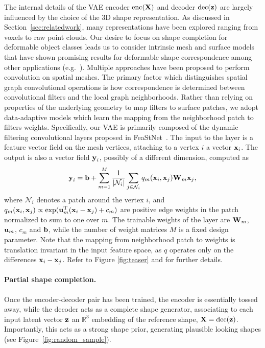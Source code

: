 The internal details of the VAE encoder $\mathrm{enc}(\bm{\mathrm{X}})$ and decoder $\mathrm{dec}(\bm{\mathrm{z}})$ are largely influenced by the choice of the 3D shape representation. As discussed in Section~\ref{sec:relatedwork}, many representations have been explored ranging from voxels to raw point clouds. Our desire to focus on shape completion for deformable object classes leads us to consider intrinsic mesh and surface models that have shown promising results for deformable shape correspondence among other applications (e.g.~\cite{masci15,monet}). Multiple approaches have been proposed to perform convolution on spatial meshes. The primary factor which distinguishes spatial graph convolutional operations is how correspondence is determined between convolutional filters and the local graph neighborhoods. Rather than relying on properties of the underlying geometry to map filters to surface patches, we adopt data-adaptive models which learn the mapping from the neighborhood patch to filters weights. Specifically, our VAE is primarily composed of the dynamic filtering convolutional layers proposed in FeaStNet~\cite{dynFilt}. The input to the layer is a feature vector field on the mesh vertices, attaching to a vertex $i$ a vector $\bm{\mathrm{x}}_i$. The output is also a vector field $\bm{\mathrm{y}}_i$, possibly of a different dimension, computed as  
\begin{align}\label{eq:filt}
\bm{\mathrm{y}}_i = \bm{\mathrm{b}} + \sum_{m=1}^{M} \frac{1}{|\mathcal{N}_i|} \sum_{j\in \mathcal{N}_i} q_m(\bm{\mathrm{x}}_i, \bm{\mathrm{x}}_j) \bm{\mathrm{W}}_m \bm{\mathrm{x}}_j,
\end{align}
where $\mathcal{N}_i$ denotes a patch around the vertex $i$, and 
$q_m(\bm{\mathrm{x}}_i, \bm{\mathrm{x}}_j) \propto \exp (\bm{\mathrm{u}}_m^\mathrm{T} (\bm{\mathrm{x}}_i - \bm{\mathrm{x}}_j) + c_m)$
are positive edge weights in the patch normalized to sum to one over $m$.
%
The trainable weights of the layer are $\bm{\mathrm{W}}_m$, $\bm{\mathrm{u}}_m$, $c_m$ and $\bm{\mathrm{b}}$, while the number of weight matrices $M$ is a fixed design parameter. Note that the mapping from neighborhood patch to weights is translation invariant in the input feature space, as $q$ operates only on the differences $\bm{\mathrm{x}}_i-\bm{\mathrm{x}}_j$. Refer to Figure \ref{fig:teaser} and \cite{dynFilt} for further details.


\paragraph{Partial shape completion.}
Once the encoder-decoder pair has been trained, the encoder is essentially tossed away, while the decoder acts as a complete shape generator, associating to each input latent vector $\bm{\mathrm{z}}$ an $\mathbb{R}^3$ embedding of the reference shape, $\bm{\mathrm{X}} = \mathrm{dec}(\bm{\mathrm{z}})$. Importantly, this acts as a strong shape prior, generating plausible looking shapes (see Figure~\ref{fig:random_sample}).


